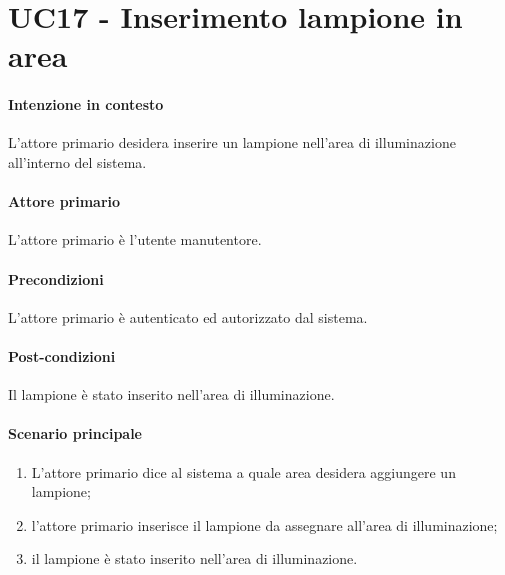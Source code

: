 \section{UC17 - Inserimento lampione in area}\label{uc:17}
\paragraph{Intenzione in contesto} L'attore primario desidera inserire un lampione nell'area di illuminazione all'interno del sistema.
\paragraph{Attore primario} L'attore primario è l'utente manutentore.
\paragraph{Precondizioni} L'attore primario è autenticato ed autorizzato dal sistema.
\paragraph{Post-condizioni} Il lampione è stato inserito nell'area di illuminazione.
\paragraph{Scenario principale}
\begin{enumerate}
    \item L'attore primario dice al sistema a quale area desidera aggiungere un lampione;
    \item l'attore primario inserisce il lampione da assegnare all'area di illuminazione;
    \item il lampione è stato inserito nell'area di illuminazione.
\end{enumerate}